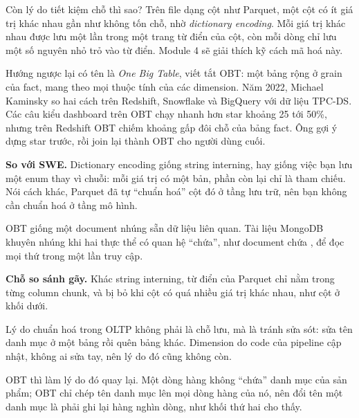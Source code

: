 Còn lý do tiết kiệm chỗ thì sao? Trên file dạng cột như Parquet, một cột có ít giá trị khác nhau gần như không tốn chỗ, nhờ \textit{dictionary encoding}. Mỗi giá trị khác nhau được lưu một lần trong một trang từ điển của cột, còn mỗi dòng chỉ lưu một số nguyên nhỏ trỏ vào từ điển. Module 4 sẽ giải thích kỹ cách mã hoá này.

Hướng ngược lại có tên là \textit{One Big Table}, viết tắt OBT: một bảng rộng ở grain của fact, mang theo mọi thuộc tính của các dimension. Năm 2022, Michael Kaminsky so hai cách trên Redshift, Snowflake và BigQuery với dữ liệu TPC-DS. Các câu kiểu dashboard trên OBT chạy nhanh hơn star khoảng 25 tới 50\%, nhưng trên Redshift OBT chiếm khoảng gấp đôi chỗ của bảng fact. Ông gợi ý dựng star trước, rồi join lại thành OBT cho người dùng cuối.

\begin{ghichu}
\textbf{So với SWE.} Dictionary encoding giống string interning, hay giống việc bạn lưu một enum thay vì chuỗi: mỗi giá trị có một bản, phần còn lại chỉ là tham chiếu. Nói cách khác, Parquet đã tự ``chuẩn hoá'' cột đó ở tầng lưu trữ, nên bạn không cần chuẩn hoá ở tầng mô hình.

OBT giống một document nhúng sẵn dữ liệu liên quan. Tài liệu MongoDB khuyên nhúng khi hai thực thể có quan hệ ``chứa'', như document  chứa , để đọc mọi thứ trong một lần truy cập.

\textbf{Chỗ so sánh gãy.} Khác string interning, từ điển của Parquet chỉ nằm trong từng column chunk, và bị bỏ khi cột có quá nhiều giá trị khác nhau, như cột  ở khối dưới.

Lý do chuẩn hoá trong OLTP không phải là chỗ lưu, mà là tránh sửa sót: sửa tên danh mục ở một bảng rồi quên bảng khác. Dimension do code của pipeline cập nhật, không ai sửa tay, nên lý do đó cũng không còn.

OBT thì làm lý do đó quay lại. Một dòng hàng không ``chứa'' danh mục của sản phẩm; OBT chỉ chép tên danh mục lên mọi dòng hàng của nó, nên đổi tên một danh mục là phải ghi lại hàng nghìn dòng, như khối thứ hai cho thấy.
\end{ghichu}

